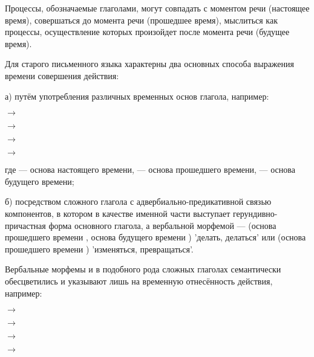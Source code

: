 Процессы, обозначаемые глаголами, могут совпадать с моментом речи (настоящее время), совершаться до момента речи (прошедшее время), мыслиться как процессы, осуществление которых произойдет после момента речи (будущее время).

Для старого письменного языка характерны два основных способа выражения времени совершения действия:

а) путём употребления различных временных основ глагола, например:

\begin{description}
\item{} $\rightarrow$
\item$\rightarrow$
\item$\rightarrow$
\item$\rightarrow$
\end{description}

где	 --- основа настоящего времени,  --- основа прошедшего времени,  --- основа будущего времени;

б) посредством сложного глагола с адвербиально-предикативной связью компонентов, в котором в качестве именной части выступает герундивно-причастная форма основного
глагола, а вербальной морфемой ---  (основа прошедшего времени , основа будущего времени ) 'делать, делаться' или	 (основа прошедшего времени ) 'изменяться, превращаться'.

Вербальные морфемы  и  в подобного рода сложных глаголах семантически обесцветились и указывают лишь на временную отнесённость действия, например:

\begin{description}
	\item{} $\rightarrow$
	\item$\rightarrow$
	\item$\rightarrow$
	\item$\rightarrow$
\end{description}

